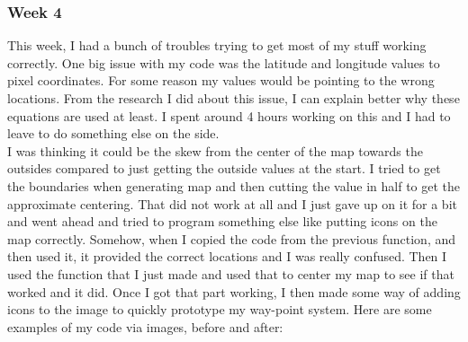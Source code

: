 \subsubsection{Week 4}
This week, I had a bunch of troubles trying to get most of my stuff working correctly.
One big issue with my code was the latitude and longitude values to pixel coordinates. For some reason my values would be pointing to the wrong locations.
From the research I did about this issue, I can explain better why these equations are used at least.
I spent around 4 hours working on this and I had to leave to do something else on the side.
\\
I was thinking it could be the skew from the center of the map towards the outsides compared to just getting the outside values at the start.
I tried to get the boundaries when generating map and then cutting the value in half to get the approximate centering.
That did not work at all and I just gave up on it for a bit and went ahead and tried to program something else like putting icons on the map correctly.
Somehow, when I copied the code from the previous function, and then used it, it provided the correct locations and I was really confused.
Then I used the function that I just made and used that to center my map to see if that worked and it did.
Once I got that part working, I then made some way of adding icons to the image to quickly prototype my way-point system.
Here are some examples of my code via images, before and after:
